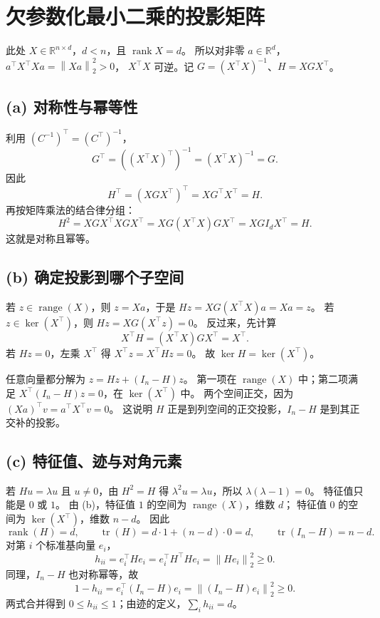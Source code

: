 \documentclass[UTF8,a4paper,11pt,fontset=fandol]{ctexart}
\newcommand{\R}{\mathbb R}
\newcommand{\norm}[1]{\left\lVert#1\right\rVert}
\DeclareMathOperator{\tr}{tr}
\DeclareMathOperator{\rank}{rank}
\begin{document}
\section{欠参数化最小二乘的投影矩阵}
此处 $X\in\R^{n\times d}$，$d<n$，且 $\rank X=d$。
所以对非零 $a\in\R^d$，$a^\top X^\top Xa=\norm{Xa}_2^2>0$，
$X^\top X$ 可逆。记 $G=(X^\top X)^{-1}$、$H=XGX^\top$。

\subsection*{(a) 对称性与幂等性}
利用 $(C^{-1})^\top=(C^\top)^{-1}$，
\[
 G^\top=((X^\top X)^\top)^{-1}=(X^\top X)^{-1}=G.
\]
因此
\[
 H^\top=(XGX^\top)^\top=XG^\top X^\top=H.
\]
再按矩阵乘法的结合律分组：
\[
 H^2=XGX^\top XGX^\top
 =XG(X^\top X)GX^\top=XGI_dX^\top=H.
\]
这就是对称且幂等。

\subsection*{(b) 确定投影到哪个子空间}
若 $z\in\operatorname{range}(X)$，则 $z=Xa$，于是
$Hz=XG(X^\top X)a=Xa=z$。
若 $z\in\ker(X^\top)$，则 $Hz=XG(X^\top z)=0$。
反过来，先计算
\[
 X^\top H=(X^\top X)GX^\top=X^\top.
\]
若 $Hz=0$，左乘 $X^\top$ 得 $X^\top z=X^\top Hz=0$。
故 $\ker H=\ker(X^\top)$。

任意向量都分解为 $z=Hz+(I_n-H)z$。
第一项在 $\operatorname{range}(X)$ 中；第二项满足
$X^\top(I_n-H)z=0$，在 $\ker(X^\top)$ 中。
两个空间正交，因为 $(Xa)^\top v=a^\top X^\top v=0$。
这说明 $H$ 正是到列空间的正交投影，$I_n-H$ 是到其正交补的投影。

\subsection*{(c) 特征值、迹与对角元素}
若 $Hu=\lambda u$ 且 $u\ne0$，由 $H^2=H$ 得
$\lambda^2u=\lambda u$，所以 $\lambda(\lambda-1)=0$。
特征值只能是 $0$ 或 $1$。
由 (b)，特征值 $1$ 的空间为 $\operatorname{range}(X)$，维数 $d$；
特征值 $0$ 的空间为 $\ker(X^\top)$，维数 $n-d$。
因此
\[
 \rank(H)=d,\qquad \tr(H)=d\cdot1+(n-d)\cdot0=d,
 \qquad\tr(I_n-H)=n-d.
\]
对第 $i$ 个标准基向量 $e_i$，
\[
 h_{ii}=e_i^\top He_i=e_i^\top H^\top He_i=\norm{He_i}_2^2\geq0.
\]
同理，$I_n-H$ 也对称幂等，故
\[
 1-h_{ii}=e_i^\top(I_n-H)e_i=\norm{(I_n-H)e_i}_2^2\geq0.
\]
两式合并得到 $0\leq h_{ii}\leq1$；由迹的定义，$\sum_i h_{ii}=d$。
\end{document}
